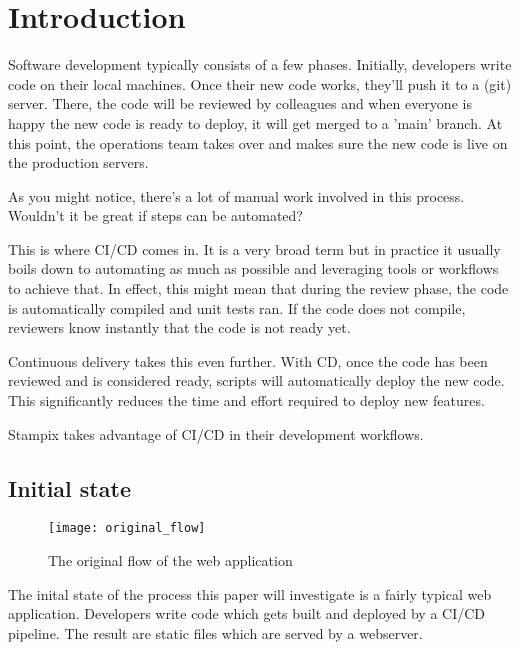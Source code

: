 
\chapter{Introduction} %

\label{Chapter1} 


Software development typically consists of a few phases. Initially, developers write code on their local machines. 
Once their new code works, they'll push it to a (git) server. 
There, the code will be reviewed by colleagues and when everyone is happy the new code is ready to deploy, it will get merged to a 'main' branch.
At this point, the operations team takes over and makes sure the new code is live on the production servers.

As you might notice, there's a lot of manual work involved in this process. Wouldn't it be great if steps can be automated?

This is where CI/CD comes in. It is a very broad term but in practice it usually boils down to automating as much as possible and leveraging tools or workflows to achieve that.
In effect, this might mean that during the review phase, the code is automatically compiled and unit tests ran. If the code does not compile, reviewers know instantly that the code is not ready yet.

Continuous delivery \cite{Humble-CD} takes this even further. With CD, once the code has been reviewed and is considered ready, scripts will automatically deploy the new code.
This significantly reduces the time and effort required to deploy new features.

Stampix takes advantage of CI/CD in their development workflows.

\section{Initial state}

\begin{figure}[h!]
	\texttt{[image: original\_flow]}
	\caption{The original flow of the web application}
	\label{fig:original_flow}
\end{figure}


The inital state of the process this paper will investigate is a fairly typical web application. Developers write code which gets built and deployed by a CI/CD pipeline. The result are static files which are served by a webserver.

